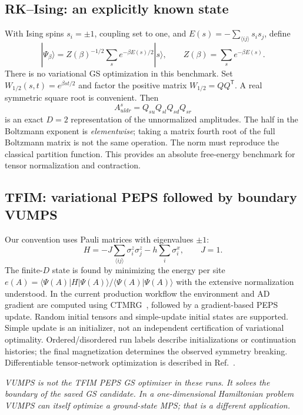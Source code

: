 \documentclass[11pt]{article}
\newcommand{\smallnote}[1]{\par\smallskip\noindent\textit{#1}\par\smallskip}
\begin{document}
\subsection{RK--Ising: an explicitly known state}
With Ising spins $s_i=\pm1$, coupling set to one, and
$E(s)=-\sum_{\langle ij\rangle}s_i s_j$, define
\begin{equation}
 |\Psi_\beta\rangle=Z(\beta)^{-1/2}
 \sum_s e^{-\beta E(s)/2}|s\rangle,
 \qquad Z(\beta)=\sum_s e^{-\beta E(s)}.
\end{equation}
There is no variational GS optimization in this benchmark. Set
$W_{1/2}(s,t)=e^{\beta st/2}$ and factor the positive matrix
$W_{1/2}=Q Q^{\mathsf T}$. A real symmetric square root is convenient. Then
\begin{equation}
 A^s_{uldr}=Q_{su}Q_{sl}Q_{sd}Q_{sr}
\end{equation}
is an exact $D=2$ representation of the unnormalized amplitudes.
The half in the Boltzmann exponent is \emph{elementwise}; taking a matrix
fourth root of the full Boltzmann matrix is not the same operation.
The norm must reproduce the classical partition function. This provides
an absolute free-energy benchmark for tensor normalization and contraction.

\subsection{TFIM: variational PEPS followed by boundary VUMPS}
Our convention uses Pauli matrices with eigenvalues $\pm1$:
\begin{equation}
 H=-J\sum_{\langle ij\rangle}\sigma_i^z\sigma_j^z
   -h\sum_i\sigma_i^x,\qquad J=1.
\end{equation}
The finite-$D$ state is found by minimizing the energy per site
$e(A)=\langle\Psi(A)|H|\Psi(A)\rangle/
\langle\Psi(A)|\Psi(A)\rangle$ with the extensive normalization understood.
In the current production workflow the environment and AD gradient are
computed using CTMRG~\cite{ctm}, followed by a gradient-based PEPS update.
Random initial tensors and simple-update initial states are supported.
Simple update is an initializer, not an independent certification of
variational optimality. Ordered/disordered run labels describe initializations
or continuation histories; the final magnetization determines the observed
symmetry breaking. Differentiable tensor-network optimization is described
in Ref.~\cite{liao}.

\smallnote{VUMPS is not the TFIM PEPS GS optimizer in these runs. It solves the
boundary of the saved GS candidate. In a one-dimensional Hamiltonian problem
VUMPS can itself optimize a ground-state MPS; that is a different application.}
\end{document}
